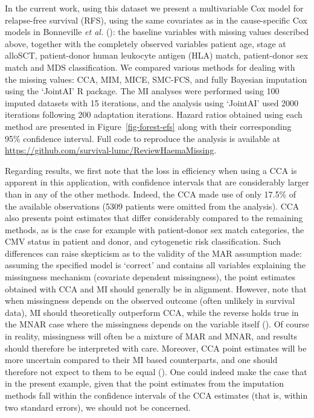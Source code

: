 \documentclass[
  letterpaper,
  DIV=11,
  numbers=noendperiod]{scrreprt}
\begin{document}
In the current work, using this dataset we present a multivariable Cox
model for relapse-free survival (RFS), using the same covariates as in
the cause-specific Cox models in Bonneville \emph{et al.}
():
the baseline variables with missing values described above, together
with the completely observed variables patient age, stage at alloSCT,
patient-donor human leukocyte antigen (HLA) match, patient-donor sex
match and MDS classification. We compared various methods for dealing
with the missing values: CCA, MIM, MICE, SMC-FCS, and fully Bayesian
imputation using the `JointAI' R package. The MI analyses were performed
using 100 imputed datasets with 15 iterations, and the analysis using
`JointAI' used 2000 iterations following 200 adaptation iterations.
Hazard ratios obtained using each method are presented in
Figure~\ref{fig-forest-efs} along with their corresponding 95\%
confidence interval. Full code to reproduce the analysis is available at
\url{https://github.com/survival-lumc/ReviewHaemaMissing}.

Regarding results, we first note that the loss in efficiency when using
a CCA is apparent in this application, with confidence intervals that
are considerably larger than in any of the other methods. Indeed, the
CCA made use of only 17.5\% of the available observations (5309 patients
were omitted from the analysis). CCA also presents point estimates that
differ considerably compared to the remaining methods, as is the case
for example with patient-donor sex match categories, the CMV status in
patient and donor, and cytogenetic risk classification. Such differences
can raise skepticism as to the validity of the MAR assumption made:
assuming the specified model is `correct' and contains all variables
explaining the missingness mechanism (covariate dependent missingness),
the point estimates obtained with CCA and MI should generally be in
alignment. However, note that when missingness depends on the observed
outcome (often unlikely in survival data), MI should theoretically
outperform CCA, while the reverse holds true in the MNAR case where the
missingness depends on the variable itself
(). Of course in reality, missingness will often be a mixture of MAR
and MNAR, and results should therefore be interpreted with care.
Moreover, CCA point estimates will be more uncertain compared to their
MI based counterparts, and one should therefore not expect to them to be
equal (). One could indeed make the case that in the present example,
given that the point estimates from the imputation methods fall within
the confidence intervals of the CCA estimates (that is, within two
standard errors), we should not be concerned.
\end{document}
